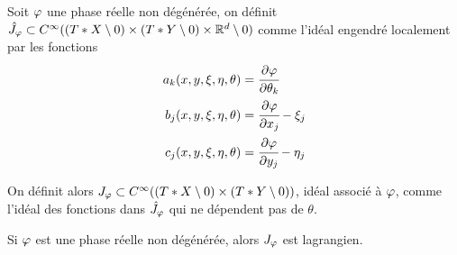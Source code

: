 \begin{defn}
	Soit $\varphi$ une phase réelle non dégénérée, on définit $\hat{J}_\varphi \subset C^{\infty}((T*X\setminus 0)\times (T*Y\setminus 0) \times \mathbb{R}^d \setminus 0)$ comme l'idéal engendré localement par les fonctions
	\begin{align*}
		a_k(x,y,\xi,\eta,\theta)&=\cfrac{\partial \varphi}{\partial \theta_k}\\
		b_j(x,y,\xi,\eta,\theta) &= \cfrac{\partial \varphi}{\partial x_j}-\xi_j\\
		c_j(x,y,\xi,\eta,\theta) &= \cfrac{\partial \varphi}{\partial y_j}-\eta_j
	\end{align*}
	
	On définit alors $J_{\varphi}\subset C^{\infty}((T*X\setminus 0)\times (T*Y\setminus 0))$, idéal associé à $\varphi$, comme l'idéal des fonctions dans $\hat{J}_{\varphi}$ qui ne dépendent pas de $\theta$.
\end{defn}
\begin{prop}
	Si $\varphi$ est une phase réelle non dégénérée, alors $J_{\varphi}$ est lagrangien.
\end{prop}

